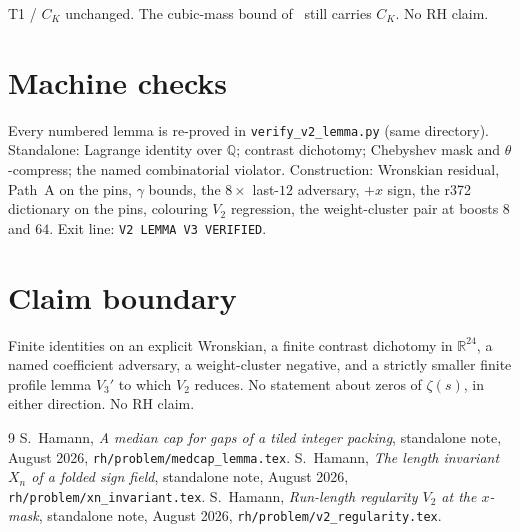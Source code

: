 \documentclass[11pt]{article}
\theoremstyle{remark}
\newcommand{\Q}{\mathbb{Q}}
\newcommand{\R}{\mathbb{R}}
\begin{document}
T1 / $C_K$ unchanged.  The cubic-mass bound of~\cite{medcap}
still carries $C_K$.  No RH claim.

\section{Machine checks}\label{sec:machine}

Every numbered lemma is re-proved in
\texttt{verify\_v2\_lemma.py} (same directory).  Standalone:
Lagrange identity over $\Q$; contrast dichotomy; Chebyshev
mask and $\theta$-compress; the named combinatorial violator.
Construction: Wronskian residual, Path~A on the pins, $\gamma$
bounds, the $8\times$ last-$12$ adversary, $+x$ sign, the
r372 dictionary on the pins, colouring $V_2$ regression, the
weight-cluster pair at boosts $8$ and $64$.
Exit line: \texttt{V2 LEMMA V3 VERIFIED}.

\section*{Claim boundary}

Finite identities on an explicit Wronskian, a finite contrast
dichotomy in $\R^{24}$, a named coefficient adversary, a
weight-cluster negative, and a strictly smaller finite profile
lemma $V_3'$ to which $V_2$ reduces.  No statement about zeros
of $\zeta(s)$, in either direction.  No RH claim.

\begin{thebibliography}{9}
S.~Hamann,
\textit{A median cap for gaps of a tiled integer packing},
standalone note, August 2026,
\texttt{rh/problem/medcap\_lemma.tex}.
S.~Hamann,
\textit{The length invariant $X_n$ of a folded sign field},
standalone note, August 2026,
\texttt{rh/problem/xn\_invariant.tex}.
S.~Hamann,
\textit{Run-length regularity $V_2$ at the $x$-mask},
standalone note, August 2026,
\texttt{rh/problem/v2\_regularity.tex}.
\end{thebibliography}
\end{document}
